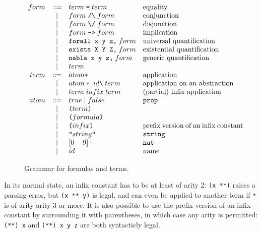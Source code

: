 \documentclass{article}
\begin{document}
\begin{figure}
\[\begin{array}{rclp{5cm}}
form &::=& term\;\verb.=.\;term         & equality \\
     & | & form\;\verb./\.\;form        & conjunction \\
     & | & form\;\verb.\/.\;form        & disjunction \\
     & | & form\;\verb.->.\;form        & implication \\
     & | & \verb.forall x y z,.\;form   & universal quantification \\
     & | & \verb.exists X Y Z,.\;form   & existential quantification \\
     & | & \verb.nabla x y z,.\;form    & generic quantification \\
     & | & term                         & \\
term &::=& atom*                        & application \\
     & | & atom*\;id\verb.\.\;term      & application on an
                                          abstraction \\
     & | & term\;infix\;term            & (partial) infix application \\
atom &::=& true\;|\;false               & {\tt prop} \\
     & | & \verb.(.term\verb.).         & \\
     & | & \verb.(.formula\verb.).      & \\
     & | & \verb.(.infix\verb.).        & prefix version of an infix
                                          constant\\
     & | & \verb.".string\verb.".       & {\tt string} \\
     & | & [0-9]+                       & {\tt nat} \\
     & | & id                           & name \\
\end{array}\]
\caption{Grammar for formulas and terms.}
\label{concrete}
\end{figure}

In its normal state, an infix constant has to be at least of arity 2:
{\tt (x **)} raises a parsing error, but {\tt (x ** y)} is legal, and can
even be applied to another term if {\tt **} is of arity arity 3 or more.
It is also possible to use the prefix version of an infix constant by
surrounding it with parentheses, in which case any arity is permitted:
{\tt (**) x} and {\tt (**) x y z} are both syntacticly legal.
\end{document}
